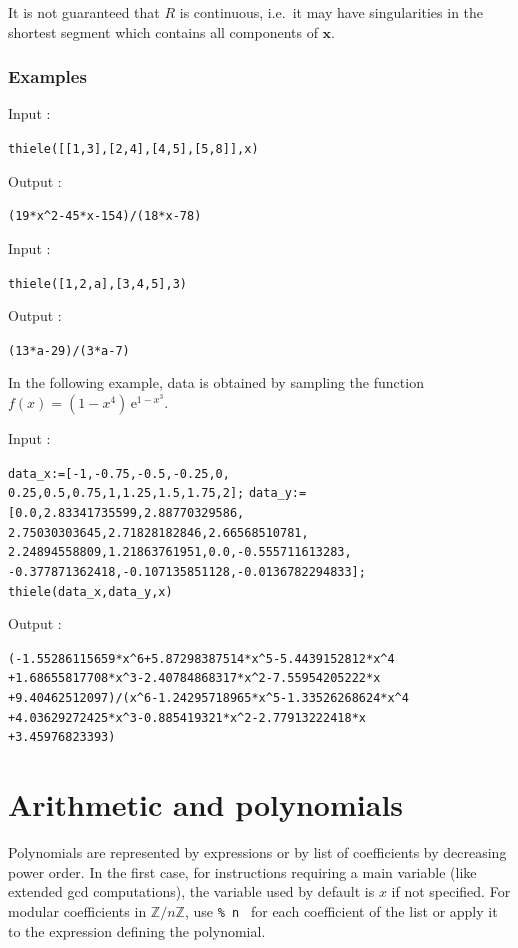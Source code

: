 \documentclass[a4paper,11pt]{book}
\newcommand{\Z}{{\mathbb{Z}}}
\begin{document}
It is not guaranteed that $ R $ is continuous, i.e.~it may have singularities in the shortest segment which contains all components of $ \mathbf{x} $.

\subsubsection{Examples}
\noindent Input :
\begin{center}{\tt thiele([[1,3],[2,4],[4,5],[5,8]],x)}\end{center}
Output :
\begin{center}{\tt (19*x\verb|^|2-45*x-154)/(18*x-78)}\end{center}
Input :
\begin{center}{\tt thiele([1,2,a],[3,4,5],3)}\end{center}
Output :
\begin{center}{\tt (13*a-29)/(3*a-7)}\end{center}

In the following example, data is obtained by sampling the function $ f(x)=(1-x^4)\,\mathrm{e}^{1-x^3} $.

\noindent Input :
\begin{center}
{\tt data\_x:=[-1,-0.75,-0.5,-0.25,0,}\\
{\tt 0.25,0.5,0.75,1,1.25,1.5,1.75,2];}
{\tt data\_y:=[0.0,2.83341735599,2.88770329586,}\\
{\tt 2.75030303645,2.71828182846,2.66568510781,}\\
{\tt 2.24894558809,1.21863761951,0.0,-0.555711613283,}
{\tt -0.377871362418,-0.107135851128,-0.0136782294833];}
{\tt thiele(data\_x,data\_y,x)}
\end{center}
Output :
\begin{center}
{\tt (-1.55286115659*x\verb|^|6+5.87298387514*x\verb|^|5-5.4439152812*x\verb|^|4}\\
{\tt +1.68655817708*x\verb|^|3-2.40784868317*x\verb|^|2-7.55954205222*x}\\
{\tt +9.40462512097)/(x\verb|^|6-1.24295718965*x\verb|^|5-1.33526268624*x\verb|^|4}\\
{\tt +4.03629272425*x\verb|^|3-0.885419321*x\verb|^|2-2.77913222418*x}\\
{\tt +3.45976823393)}
\end{center}

\section{Arithmetic and polynomials}
Polynomials are represented by expressions or by list of coefficients
by decreasing power order. In the first case, for instructions requiring
a main variable (like extended gcd computations), the variable
used by default is $x$ if not specified. For modular coefficients
in $\Z/n\Z$, use {\tt \% n } for each coefficient of the list
or apply it to the expression defining the polynomial.
\end{document}
